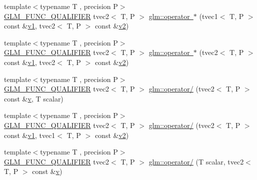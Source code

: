 \begin{DoxyCompactItemize}
\item 
{\footnotesize template$<$typename T , precision P$>$ }\\\mbox{\hyperlink{setup_8hpp_a33fdea6f91c5f834105f7415e2a64407}{G\+L\+M\+\_\+\+F\+U\+N\+C\+\_\+\+Q\+U\+A\+L\+I\+F\+I\+ER}} tvec2$<$ T, P $>$ \mbox{\hyperlink{namespaceglm_a8704e8a4d96f8a8302b37109f1f7a2cb}{glm\+::operator $\ast$}} (tvec1$<$ T, P $>$ const \&\mbox{\hyperlink{glad_8h_a0779c3b73f9aa3a0ac5b0139b5d291d9}{v1}}, tvec2$<$ T, P $>$ const \&\mbox{\hyperlink{glad_8h_a9a09a1837922b2b806f4589096a52049}{v2}})
\item 
{\footnotesize template$<$typename T , precision P$>$ }\\\mbox{\hyperlink{setup_8hpp_a33fdea6f91c5f834105f7415e2a64407}{G\+L\+M\+\_\+\+F\+U\+N\+C\+\_\+\+Q\+U\+A\+L\+I\+F\+I\+ER}} tvec2$<$ T, P $>$ \mbox{\hyperlink{namespaceglm_a6fe3f02725cef4308d6bfa89944ba354}{glm\+::operator $\ast$}} (tvec2$<$ T, P $>$ const \&\mbox{\hyperlink{glad_8h_a0779c3b73f9aa3a0ac5b0139b5d291d9}{v1}}, tvec2$<$ T, P $>$ const \&\mbox{\hyperlink{glad_8h_a9a09a1837922b2b806f4589096a52049}{v2}})
\item 
{\footnotesize template$<$typename T , precision P$>$ }\\\mbox{\hyperlink{setup_8hpp_a33fdea6f91c5f834105f7415e2a64407}{G\+L\+M\+\_\+\+F\+U\+N\+C\+\_\+\+Q\+U\+A\+L\+I\+F\+I\+ER}} tvec2$<$ T, P $>$ \mbox{\hyperlink{namespaceglm_a0f99bfb6853161b7abb55459d73a5bd8}{glm\+::operator/}} (tvec2$<$ T, P $>$ const \&\mbox{\hyperlink{glad_8h_a14cfbe2fc2234f5504618905b69d1e06}{v}}, T scalar)
\item 
{\footnotesize template$<$typename T , precision P$>$ }\\\mbox{\hyperlink{setup_8hpp_a33fdea6f91c5f834105f7415e2a64407}{G\+L\+M\+\_\+\+F\+U\+N\+C\+\_\+\+Q\+U\+A\+L\+I\+F\+I\+ER}} tvec2$<$ T, P $>$ \mbox{\hyperlink{namespaceglm_aa0ae766d2fcdb8e7414eeebd47750792}{glm\+::operator/}} (tvec2$<$ T, P $>$ const \&\mbox{\hyperlink{glad_8h_a0779c3b73f9aa3a0ac5b0139b5d291d9}{v1}}, tvec1$<$ T, P $>$ const \&\mbox{\hyperlink{glad_8h_a9a09a1837922b2b806f4589096a52049}{v2}})
\item 
{\footnotesize template$<$typename T , precision P$>$ }\\\mbox{\hyperlink{setup_8hpp_a33fdea6f91c5f834105f7415e2a64407}{G\+L\+M\+\_\+\+F\+U\+N\+C\+\_\+\+Q\+U\+A\+L\+I\+F\+I\+ER}} tvec2$<$ T, P $>$ \mbox{\hyperlink{namespaceglm_a1ab3904804ca6bd69d39bcb9c6432012}{glm\+::operator/}} (T scalar, tvec2$<$ T, P $>$ const \&\mbox{\hyperlink{glad_8h_a14cfbe2fc2234f5504618905b69d1e06}{v}})

\end{DoxyCompactItemize}
